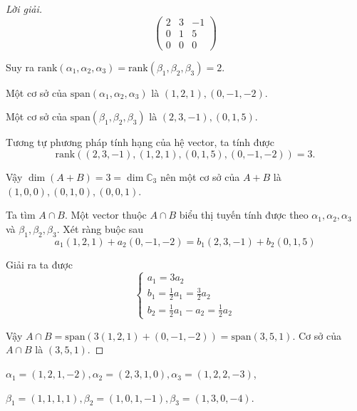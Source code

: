 \documentclass[class=linear-algebra,crop=false]{standalone}
\begin{document}
\begin{proof}[Lời giải]
\[        \begin{pmatrix}
            2 & 3 & -1 \\
            0 & 1 & 5  \\
            0 & 0 & 0
        \end{pmatrix}
    \]
    \par Suy ra $\text{rank}(\alpha_{1},\alpha_{2},\alpha_{3}) = \text{rank}(\beta_{1},\beta_{2},\beta_{3}) = 2$.
    \par Một cơ sở của $\text{span}(\alpha_{1},\alpha_{2},\alpha_{3})$ là $(1,2,1), (0,-1,-2)$.
    \par Một cơ sở của $\text{span}(\beta_{1},\beta_{2},\beta_{3})$ là $(2,3,-1), (0,1,5)$.
    \par Tương tự phương pháp tính hạng của hệ vector, ta tính được
    \[ \text{rank}((2,3,-1),(1,2,1),(0,1,5),(0,-1,-2)) = 3. \]
    \par Vậy $\dim (A + B) = 3 = \dim\mathbb{C}_{3}$ nên một cơ sở của $A + B$ là $(1,0,0), (0,1,0), (0,0,1)$.
    \par Ta tìm $A\cap B$. Một vector thuộc $A\cap B$ biểu thị tuyến tính được theo $\alpha_{1}, \alpha_{2}, \alpha_{3}$ và $\beta_{1}, \beta_{2}, \beta_{3}$. Xét ràng buộc sau
    \[ a_{1}(1,2,1) + a_{2}(0,-1,-2) = b_{1}(2,3,-1) + b_{2}(0,1,5) \]
    \par Giải ra ta được
    \[
        \begin{cases}
            a_{1} = 3a_{2}                              \\
            b_{1} = \frac{1}{2}a_{1} = \frac{3}{2}a_{2} \\
            b_{2} = \frac{1}{2}a_{1} - a_{2} = \frac{1}{2}a_{2}
        \end{cases}
    \]
    \par Vậy $A\cap B = \text{span}(3(1,2,1) + (0,-1,-2)) = \text{span}(3,5,1)$. Cơ sở của $A\cap B$ là $(3,5,1)$.
\end{proof}

\begin{exercise}$\alpha_{1} = (1,2,1,-2), \alpha_{2} = (2,3,1,0), \alpha_{3} = (1,2,2,-3)$,
    \par $\beta_{1} = (1,1,1,1), \beta_{2} = (1,0,1,-1), \beta_{3} = (1,3,0,-4)$.
\end{exercise}
\end{document}
